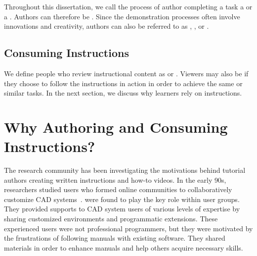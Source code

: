 Throughout this dissertation, we call the process of author completing a task a  or a . Authors can therefore be .
%
Since the demonstration processes often involve innovations and creativity, authors can also be referred to as , , or .


\subsection{Consuming Instructions}
We define people who review instructional content as  or . Viewers may also be  if they choose to follow the instructions in action in order to achieve the same or similar tasks. In the next section, we discuss why learners rely on instructions.



\section{Why Authoring and Consuming Instructions?}
\label{background_why}

The research community has been investigating the motivations behind tutorial authors creating written instructions and how-to videos.
%
In the early 90s, researchers studied users who formed online communities to collaboratively customize CAD systems~\cite{Gantt:1992:GGP:142750.142767}.  were found to play the key role within user groups. They provided supports to CAD system users of various levels of expertise by sharing customized environments and programmatic extensions. These experienced users were not professional programmers, but they were motivated by the frustrations of following manuals with existing software. They shared materials in order to enhance manuals and help others acquire necessary skills.

